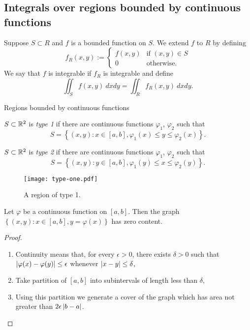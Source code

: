 \subsection{Integrals over regions bounded by continuous functions}

\begin{definition}
    Suppose \(S\subset R\) and \(f\) is a bounded function on \(S\).
    We extend \(f\) to \(R\) by defining
    \[
        f_R(x,y) := \begin{cases}
            f(x,y) & \text{if \((x,y)\in S\)} \\
            0      & \text{otherwise}.
        \end{cases}
    \]
    We say that \(f\) is integrable if \(f_{R}\) is integrable and define
    \[
        \iint_{S} f(x,y) \ dxdy = \iint_{R} f_{R}(x,y) \ dx dy.
    \]
\end{definition}

{Regions bounded by continuous functions}

\begin{definition}[type 1]
    \(S \subset \mathbb{R}^2\) is \emph{type 1} if there are continuous functions \(\varphi_1\), \(\varphi_2\) such that
    \[
        S = \left\{(x,y): x \in [a,b], \varphi_1(x) \leq y \leq \varphi_2(x)\right\}.
    \]
\end{definition}
\begin{definition}[type 2]
    \(S \subset \mathbb{R}^2\) is \emph{type 2} if there are continuous functions \(\varphi_1\), \(\varphi_2\) such that
    \[
        S = \left\{(x,y): y \in [a,b], \varphi_1(y) \leq x \leq \varphi_2(y)\right\}.
    \]
\end{definition}



\begin{figure}
    \centering
    \texttt{[image: type-one.pdf]}
    \caption{A region of type 1.}
\end{figure}

\begin{theorem}
    Let \(\varphi\) be a continuous function on \([a,b]\).
    Then the graph
    \(\left\{(x,y): x\in [a,b], y=\varphi(x)\right\}\)
    has zero content.
\end{theorem}
\begin{proof}
    \begin{enumerate}
        \item Continuity means that, for every \(\epsilon>0\), there exists \(\delta>0\) such that \(\left|\varphi(x) - \varphi(y)\right|\leq \epsilon\) whenever \(\left|x-y\right|\leq \delta\),
        \item Take partition of \([a,b]\) into subintervals of length less than \(\delta\),
        \item Using this partition we generate a cover of the graph which has area not greater than \(2\epsilon \left|b-a\right|\).
    \end{enumerate}
\end{proof}


